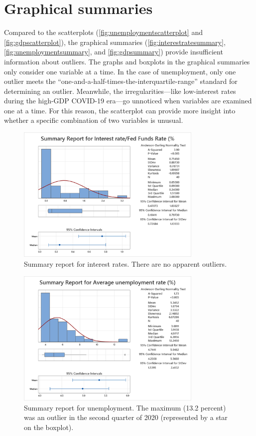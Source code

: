 \documentclass[12pt]{article}
\begin{document}
\section{Graphical summaries}
Compared to the scatterplots (\autoref{fig:unemploymentscatterplot} and \autoref{fig:gdpscatterplot}), the graphical summaries (\autoref{fig:interestratesummary}, \autoref{fig:unemploymentsummary}, and \autoref{fig:gdpsummary}) provide insufficient information about outliers. The graphs and boxplots in the graphical summaries only consider one variable at a time. In the case of unemployment, only one outlier meets the ``one-and-a-half-times-the-interquartile-range'' standard for determining an outlier. Meanwhile, the irregularities---like low-interest rates during the high-GDP COVID-19 era---go unnoticed when variables are examined one at a time. For this reason, the scatterplot can provide more insight into whether a specific combination of two variables is unusual.
\begin{figure}[ht]
\begin{center}
\includegraphics[width=3.5in]{images/interest-rate-summary.png}
\end{center}
\caption{Summary report for interest rates. There are no apparent outliers.\label{fig:interestratesummary}}
\end{figure}
\begin{figure}
\begin{center}
\includegraphics[width=3.5in]{images/unemployment-summary.png}
\end{center}
\caption{Summary report for unemployment. The maximum (13.2 percent) was an outlier in the second quarter of 2020 (represented by a star on the boxplot).\label{fig:unemploymentsummary}}
\end{figure}
\end{document}

